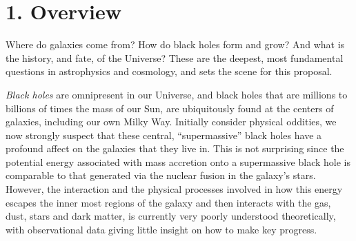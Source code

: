 \documentclass[oneside, a4paper, onecolumn, 11pt]{article}
\begin{document}


\smallskip
\smallskip
\noindent
\section*{\textcolor{Cerulean}{1. Overview}}
Where do galaxies come from? How do black holes form and grow? And
what is the history, and fate, of the Universe?  These are the
deepest, most fundamental questions in astrophysics and cosmology, and
sets the scene for this proposal.

\smallskip
\smallskip
\noindent
{\it Black holes} are omnipresent in our Universe, and black holes
that are millions to billions of times the mass of our Sun, are
ubiquitously found at the centers of galaxies, including our own Milky
Way.  Initially consider physical oddities, we now strongly suspect
that these central, ``supermassive'' black holes have a profound
affect on the galaxies that they live in. This is not surprising since
the potential energy associated with mass accretion onto a
supermassive black hole is comparable to that generated via the
nuclear fusion in the galaxy's stars.
However, the interaction and the physical processes involved in how
this energy escapes the inner most regions of the galaxy and then
interacts with the gas, dust, stars and dark matter, is currently very
poorly understood theoretically, with observational data giving little
insight on how to make key progress.
\end{document}

